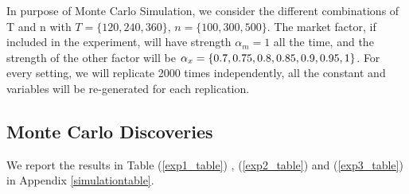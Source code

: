 
In purpose of Monte Carlo Simulation, we consider the different combinations of T and n with $T = \{120, 240, 360\}$, $n =\{100, 300, 500\} $.
The market factor, if included in the experiment, will have strength $\alpha_m = 1$ all the time, and the strength of the other factor will be $\alpha_{x} = \{0.7, 0.75, 0.8,0.85, \\
0.9,0.95, 1\}$. For every setting, we will replicate 2000 times independently, all the constant and variables will be re-generated for each replication.


 
\subsection{Monte Carlo Discoveries}
We report the results in Table (\ref{exp1_table}) , (\ref{exp2_table}) and (\ref{exp3_table}) in Appendix \ref{simulationtable}.


